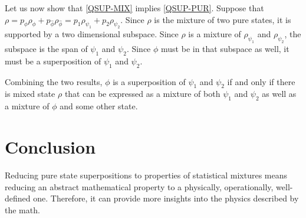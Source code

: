 \documentclass{article}
\begin{document}
\begin{demonstration}
	Let us now show that \ref{QSUP-MIX} implies \ref{QSUP-PUR}. Suppose that $\rho = p_{\phi} \rho_{\phi} + p_{\hat{\phi}} \rho_{\hat{\phi}} = p_{1} \rho_{\psi_1} + p_{2} \rho_{\psi_2}$. Since $\rho$ is the mixture of two pure states, it is supported by a two dimensional subspace. Since $\rho$ is a mixture of $\rho_{\psi_1}$ and $\rho_{\psi_2}$, the subspace is the span of $\psi_1$ and $\psi_2$. Since $\phi$ must be in that subspace as well, it must be a superposition of $\psi_1$ and $\psi_2$.
	
	Combining the two results, $\phi$ is a superposition of $\psi_1$ and $\psi_2$ if and only if there is mixed state $\rho$ that can be expressed as a mixture of both $\psi_1$ and $\psi_2$ as well as a mixture of $\phi$ and some other state.
\end{demonstration}

\section{Conclusion}

Reducing pure state superpositions to properties of statistical mixtures means reducing an abstract mathematical property to a physically, operationally, well-defined one. Therefore, it can provide more insights into the physics described by the math.
	
\end{document}

